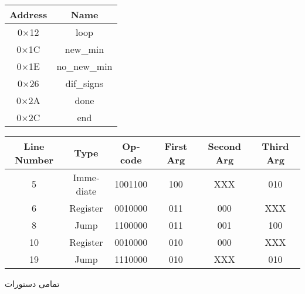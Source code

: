 \\
\noindent
{}
\begin{latin}
\begin{center}
\begin{tabular}{|c|c|}
    \hline
    Address & Name\\
    \hline
    0$\times$12 & loop\\
    \hline
    0$\times$1C & new\_min\\
    \hline
    0$\times$1E & no\_new\_min\\
    \hline
    0$\times$26 & dif\_signs\\
    \hline
    0$\times$2A & done\\
    \hline
    0$\times$2C & end\\
    \hline
\end{tabular}
\end{center}
\end{latin}
\noindent
{}
\begin{latin}
\begin{center}
\begin{tabular}{|c|c|c|c|c|c|}
    \hline
    Line Number & Type & Opcode & First Arg & Second Arg & Third Arg\\
    \hline
    5 & Immediate & 1001100 & 100 & XXX & 010\\
    \hline
    6 & Register & 0010000 & 011 & 000 & XXX\\
    \hline
    8 & Jump & 1100000 & 011 & 001 & 100\\
    \hline
    10 & Register & 0010000 & 010 & 000 & XXX\\
    \hline
    19 & Jump & 1110000 & 010 & XXX & 010\\
    \hline
\end{tabular}
\end{center}
\end{latin}
\noindent
{}
تمامی دستورات
